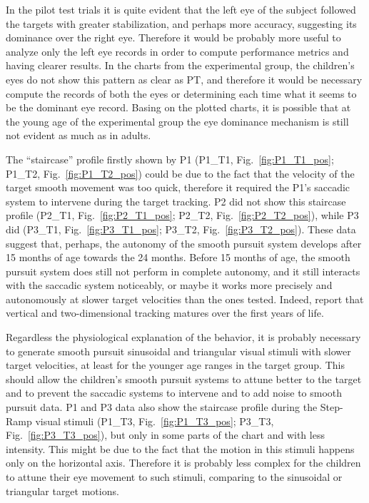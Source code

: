 In the pilot test trials it is quite evident that the left eye of the subject followed the targets with greater stabilization, and perhaps more accuracy, suggesting its dominance over the right eye. Therefore it would be probably more useful to analyze only the left eye records in order to compute performance metrics and having clearer results. In the charts from the experimental group, the children’s eyes do not show this pattern as clear as PT, and therefore it would be necessary compute the records of both the eyes or determining each time what it seems to be the dominant eye record. Basing on the plotted charts, it is possible that at the young age of the experimental group the eye dominance mechanism is still not evident as much as in adults.

The “staircase” profile firstly shown by P1 (P1\_T1, Fig.~\ref{fig:P1_T1_pos}; P1\_T2, Fig.~\ref{fig:P1_T2_pos}) could be due to the fact that the velocity of the target smooth movement was too quick, therefore it required the P1’s saccadic system to intervene during the target tracking. P2 did not show this staircase profile (P2\_T1, Fig.~\ref{fig:P2_T1_pos}; P2\_T2, Fig.~\ref{fig:P2_T2_pos}), while P3 did (P3\_T1, Fig.~\ref{fig:P3_T1_pos}; P3\_T2, Fig.~\ref{fig:P3_T2_pos}). These data suggest that, perhaps, the autonomy of the smooth pursuit system develops after 15 months of age towards the 24 months. Before 15 months of age, the smooth pursuit system does still not perform in complete autonomy, and it still interacts with the saccadic system noticeably, or maybe it works more precisely and autonomously at slower target velocities than the ones tested. Indeed, \cite{falck-ytter2013eyetrackingASD} report that vertical and two-dimensional tracking matures over the first years of life.

Regardless the physiological explanation of the behavior, it is probably necessary to generate smooth pursuit sinusoidal and triangular visual stimuli with slower target velocities, at least for the younger age ranges in the target group. This should allow the children’s smooth pursuit systems to attune better to the target and to prevent the saccadic systems to intervene and to add noise to smooth pursuit data.
P1 and P3 data also show the staircase profile during the Step-Ramp visual stimuli (P1\_T3, Fig.~\ref{fig:P1_T3_pos}; P3\_T3, Fig.~\ref{fig:P3_T3_pos}), but only in some parts of the chart and with less intensity. This might be due to the fact that the motion in this stimuli happens only on the horizontal axis. Therefore it is probably less complex for the children to attune their eye movement to such stimuli, comparing to the sinusoidal or triangular target motions.

